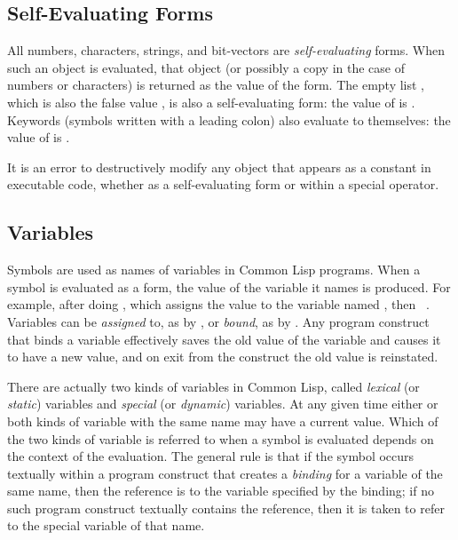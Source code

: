 \subsection{Self-Evaluating Forms}

All numbers, characters, strings, and bit-vectors
are \emph{self-evaluating} forms.
When such an object is evaluated, that object
(or possibly a copy in the case of numbers or characters)
is returned as the value
of the form.  The empty list {\emptylist}, which is also the false value {\false},
is also a self-evaluating form: the value of {\false} is {\false}.
Keywords (symbols written with a leading colon) also evaluate
to themselves: the value of  is .

It is an error to destructively modify any object that appears as a constant
in executable code, whether as
a self-evaluating form or within a  special operator.

\subsection{Variables}

Symbols are used as names of variables in Common Lisp programs.
When a symbol is evaluated as a form, the value of the variable it names
is produced.  For example, after doing , which assigns
the value  to the variable named , then  \EV\ .
Variables can be \emph{assigned} to, as by , or \emph{bound},
as by .
Any program construct that binds a variable effectively saves the old
value of the variable and causes it to have a new value, and on exit from
the construct the old value is reinstated.

There are actually two kinds of variables in Common Lisp, called \emph{lexical} (or
\emph{static}) variables and \emph{special} (or \emph{dynamic}) variables.
At any given time either or both kinds of variable with the same name may
have a current value.  Which of the two kinds of variable is referred to
when a symbol is evaluated depends on the context of the evaluation.
The general rule is that if the symbol occurs textually within a program
construct that creates a \emph{binding} for a variable of the same name,
then the reference is to the variable specified by the binding;
if no such program construct textually contains the reference, then
it is taken to refer to the special variable of that name.


